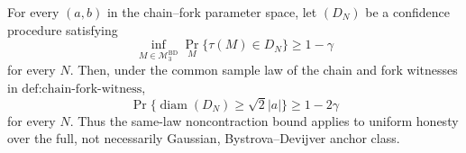 For every \((a,b)\) in the chain--fork parameter space, let \((D_N)\) be a confidence procedure satisfying
\[
 \inf_{M\in\mathcal M_3^{\mathrm{BD}}}
 \Pr_M\{\tau(M)\in D_N\}\ge 1-\gamma
\]
for every \(N\).  Then, under the common sample law of the chain and fork witnesses in \(\text{def:chain-fork-witness}\),
\[
 \Pr\{\operatorname{diam}(D_N)\ge\sqrt2|a|\}\ge1-2\gamma
\]
for every \(N\).  Thus the same-law noncontraction bound applies to uniform honesty over the full, not necessarily Gaussian, Bystrova--Devijver anchor class.